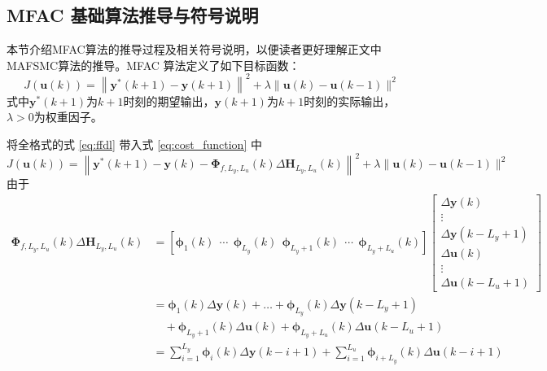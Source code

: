  \subsection{MFAC 基础算法推导与符号说明}
      \label{sub:mfac_basic}
      本节介绍MFAC算法的推导过程及相关符号说明，以便读者更好理解正文中MAFSMC算法的推导。MFAC 算法定义了如下目标函数：
      \begin{equation}
      J(\boldsymbol{u}(k)) = \left\| \boldsymbol{y}^*(k + 1) - \boldsymbol{y}(k + 1) \right\|^2 + \lambda \|\boldsymbol{u}(k) - \boldsymbol{u}(k - 1)\|^2
      \label{eq:cost_function}
      \end{equation}
      式中$\boldsymbol{y}^*(k + 1)$为$k + 1$时刻的期望输出，$\boldsymbol{y}(k + 1)$为$k + 1$时刻的实际输出，$\lambda > 0$为权重因子。

      将全格式的式 \eqref{eq:ffdl} 带入式 \eqref{eq:cost_function} 中
      \begin{equation}
      J(\boldsymbol{u}(k)) = \left\| \boldsymbol{y}^*(k + 1) - \boldsymbol{y}(k) - \boldsymbol{\Phi}_{f,L_y,L_u}(k) \Delta \boldsymbol{H}_{L_y,L_u}(k) \right\|^2 + \lambda \|\boldsymbol{u}(k) - \boldsymbol{u}(k - 1)\|^2
      \label{eq:cost_function_ffdl}
      \end{equation}
      由于
      \begin{equation}
      \begin{aligned}
      \boldsymbol{\Phi}_{f,L_y,L_u}(k) \Delta \boldsymbol{H}_{L_y,L_u}(k) &= \left[ \boldsymbol{\phi}_1(k)\ \ \cdots\ \ \boldsymbol{\phi}_{L_y}(k)\ \ \boldsymbol{\phi}_{L_y+1}(k)\ \ \cdots\ \ \boldsymbol{\phi}_{L_y+L_u}(k) \right] \begin{bmatrix}
      \Delta \boldsymbol{y}(k) \\
      \vdots \\
      \Delta \boldsymbol{y}(k - L_y + 1) \\
      \Delta \boldsymbol{u}(k) \\
      \vdots \\
      \Delta \boldsymbol{u}(k - L_u + 1)
      \end{bmatrix} \\
      &= \boldsymbol{\phi}_1(k) \Delta \boldsymbol{y}(k) + \dots + \boldsymbol{\phi}_{L_y}(k) \Delta \boldsymbol{y}(k - L_y + 1) \\
      &\quad + \boldsymbol{\phi}_{L_y+1}(k) \Delta \boldsymbol{u}(k) + \boldsymbol{\phi}_{L_y+L_u}(k) \Delta \boldsymbol{u}(k - L_u + 1) \\
      &= \sum_{i=1}^{L_y} \boldsymbol{\phi}_i(k) \Delta \boldsymbol{y}(k - i + 1) + \sum_{i=1}^{L_u} \boldsymbol{\phi}_{i+L_y}(k) \Delta \boldsymbol{u}(k - i + 1)
      \end{aligned}
      \label{eq:phi_expansion}
      \end{equation}
